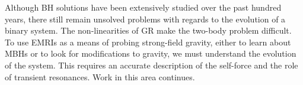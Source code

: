 Although BH solutions have been extensively studied over the past hundred years, there still remain unsolved problems with regards to the evolution of a binary system. The non-linearities of GR make the two-body problem difficult. To use EMRIs as a means of probing strong-field gravity, either to learn about MBHs or to look for modifications to gravity, we must understand the evolution of the system. This requires an accurate description of the self-force and the role of transient resonances. Work in this area continues.
